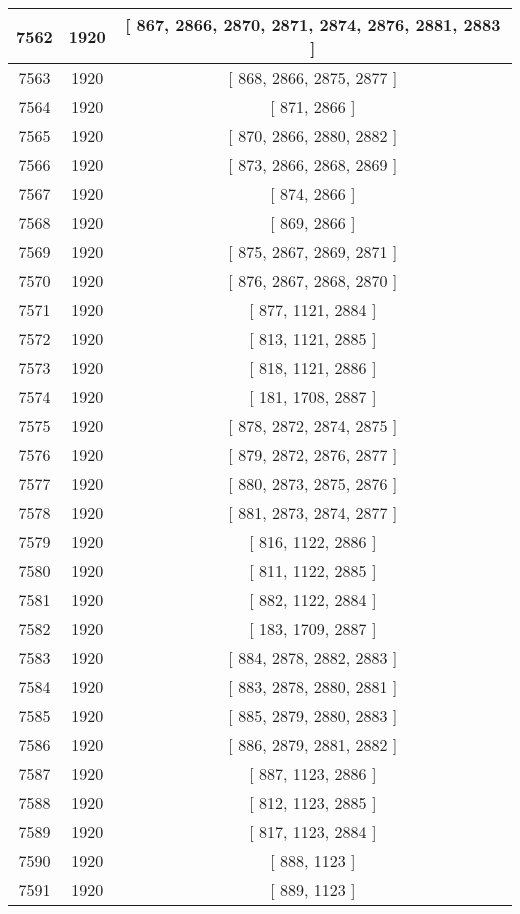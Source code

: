 \begin{center}
\begin{longtable}[H]{|| c c c ||}
\hline
7562 & 1920 & [ 867, 2866, 2870, 2871, 2874, 2876, 2881, 2883 ] \\ 
\hline
7563 & 1920 & [ 868, 2866, 2875, 2877 ] \\ 
\hline
7564 & 1920 & [ 871, 2866 ] \\ 
\hline
7565 & 1920 & [ 870, 2866, 2880, 2882 ] \\ 
\hline
7566 & 1920 & [ 873, 2866, 2868, 2869 ] \\ 
\hline
7567 & 1920 & [ 874, 2866 ] \\ 
\hline
7568 & 1920 & [ 869, 2866 ] \\ 
\hline
7569 & 1920 & [ 875, 2867, 2869, 2871 ] \\ 
\hline
7570 & 1920 & [ 876, 2867, 2868, 2870 ] \\ 
\hline
7571 & 1920 & [ 877, 1121, 2884 ] \\ 
\hline
7572 & 1920 & [ 813, 1121, 2885 ] \\ 
\hline
7573 & 1920 & [ 818, 1121, 2886 ] \\ 
\hline
7574 & 1920 & [ 181, 1708, 2887 ] \\ 
\hline
7575 & 1920 & [ 878, 2872, 2874, 2875 ] \\ 
\hline
7576 & 1920 & [ 879, 2872, 2876, 2877 ] \\ 
\hline
7577 & 1920 & [ 880, 2873, 2875, 2876 ] \\ 
\hline
7578 & 1920 & [ 881, 2873, 2874, 2877 ] \\ 
\hline
7579 & 1920 & [ 816, 1122, 2886 ] \\ 
\hline
7580 & 1920 & [ 811, 1122, 2885 ] \\ 
\hline
7581 & 1920 & [ 882, 1122, 2884 ] \\ 
\hline
7582 & 1920 & [ 183, 1709, 2887 ] \\ 
\hline
7583 & 1920 & [ 884, 2878, 2882, 2883 ] \\ 
\hline
7584 & 1920 & [ 883, 2878, 2880, 2881 ] \\ 
\hline
7585 & 1920 & [ 885, 2879, 2880, 2883 ] \\ 
\hline
7586 & 1920 & [ 886, 2879, 2881, 2882 ] \\ 
\hline
7587 & 1920 & [ 887, 1123, 2886 ] \\ 
\hline
7588 & 1920 & [ 812, 1123, 2885 ] \\ 
\hline
7589 & 1920 & [ 817, 1123, 2884 ] \\ 
\hline
7590 & 1920 & [ 888, 1123 ] \\ 
\hline
7591 & 1920 & [ 889, 1123 ] \\ 

\end{longtable}
\end{center}
